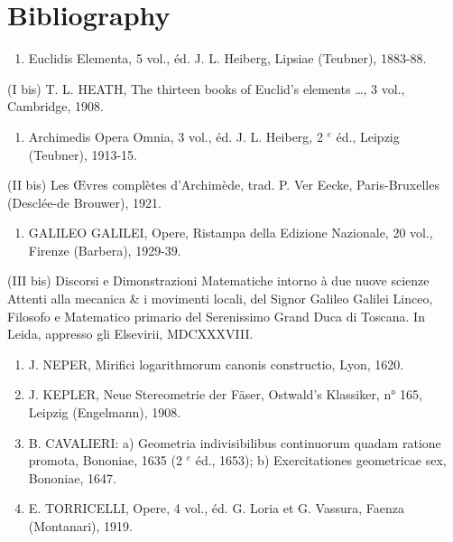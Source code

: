 \section*{Bibliography}
{}

\begin{enumerate}
\def\labelenumi{(\Roman{enumi})}
\tightlist
\item
  Euclidis Elementa, 5 vol., éd. J. L. Heiberg, Lipsiae (Teubner), 1883-88.
\end{enumerate}

(I bis) T. L. HEATH, The thirteen books of Euclid's elements \ldots, 3 vol., Cambridge, 1908.

\begin{enumerate}
\def\labelenumi{(\Roman{enumi})}
\setcounter{enumi}{1}
\tightlist
\item
  Archimedis Opera Omnia, 3 vol., éd. J. L. Heiberg, 2 \(^{e}\) éd., Leipzig (Teubner), 1913-15.
\end{enumerate}

(II bis) Les Œvres complètes d'Archimède, trad. P. Ver Eecke, Paris-Bruxelles (Desclée-de Brouwer), 1921.

\begin{enumerate}
\def\labelenumi{(\Roman{enumi})}
\setcounter{enumi}{2}
\tightlist
\item
  GALILEO GALILEI, Opere, Ristampa della Edizione Nazionale, 20 vol., Firenze (Barbera), 1929-39.
\end{enumerate}

(III bis) Discorsi e Dimonstrazioni Matematiche intorno à due nuove scienze Attenti alla mecanica \& i movimenti locali, del Signor Galileo Galilei Linceo, Filosofo e Matematico primario del Serenissimo Grand Duca di Toscana. In Leida, appresso gli Elsevirii, MDCXXXVIII.

\begin{enumerate}
\def\labelenumi{(\Roman{enumi})}
\setcounter{enumi}{3}
\item
  J. NEPER, Mirifici logarithmorum canonis constructio, Lyon, 1620.
\item
  J. KEPLER, Neue Stereometrie der Fäser, Ostwald's Klassiker, n° 165, Leipzig (Engelmann), 1908.
\item
  B. CAVALIERI: a) Geometria indivisibilibus continuorum quadam ratione promota, Bononiae, 1635 (2 \(^{e}\) éd., 1653); b) Exercitationes geometricae sex, Bononiae, 1647.
\item
  E. TORRICELLI, Opere, 4 vol., éd. G. Loria et G. Vassura, Faenza (Montanari), 1919.
\end{enumerate}


